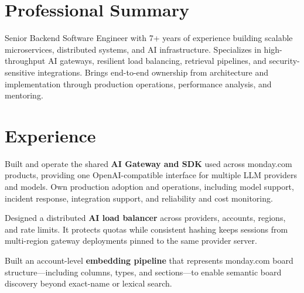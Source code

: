 \documentclass[]{plushcv}
\begin{document}

\begin{minipage}[t]{0.70\textwidth}

\section*{Professional Summary}
Senior Backend Software Engineer with 7+ years of experience building scalable
microservices, distributed systems, and AI infrastructure. Specializes in
high-throughput AI gateways, resilient load balancing, retrieval pipelines, and
security-sensitive integrations. Brings end-to-end ownership from architecture
and implementation through production operations, performance analysis, and
mentoring.

\section{Experience}

\vspace{\topsep}
\begin{tightemize}
  \sectionsep
  \item Built and operate the shared \textbf{AI Gateway and SDK} used across monday.com products, providing one OpenAI-compatible interface for multiple LLM providers and models. Own production adoption and operations, including model support, incident response, integration support, and reliability and cost monitoring.
  \item Designed a distributed \textbf{AI load balancer} across providers, accounts, regions, and rate limits. It protects quotas while consistent hashing keeps sessions from multi-region gateway deployments pinned to the same provider server.
  \item Built an account-level \textbf{embedding pipeline} that represents monday.com board structure---including columns, types, and sections---to enable semantic board discovery beyond exact-name or lexical search.
\end{tightemize}
\sectionsep


\end{minipage}
\end{document}
